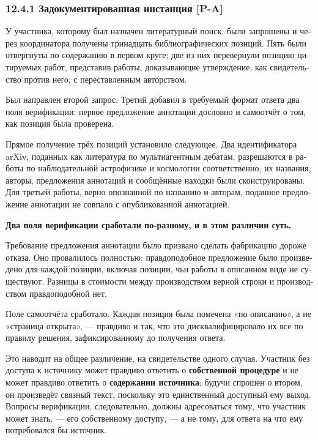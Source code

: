 \begin{russian}
\subsubsection*{12.4.1 Задокументированная инстанция \textbf{[P-A]}}
\label{sec:ru:12.4.1}

У участника, которому был назначен литературный поиск, были запрошены и через координатора получены тринадцать библиографических позиций. Пять были отвергнуты по содержанию в первом круге; две из них перевернули позицию цитируемых работ, представив работы, доказывающие утверждение, как свидетельство против него, с переставленным авторством.

Был направлен второй запрос. Третий добавил в требуемый формат ответа два поля верификации: первое предложение аннотации дословно и самоотчёт о том, как позиция была проверена.

Прямое получение трёх позиций установило следующее. Два идентификатора arXiv, поданных как литература по мультиагентным дебатам, разрешаются в работы по наблюдательной астрофизике и космологии соответственно; их названия, авторы, предложения аннотаций и сообщённые находки были сконструированы. Для третьей работы, верно опознанной по названию и авторам, поданное предложение аннотации не совпало с опубликованной аннотацией.

\textbf{Два поля верификации сработали по-разному, и в этом различии суть.}

Требование предложения аннотации было призвано сделать фабрикацию дороже отказа. Оно провалилось полностью: правдоподобное предложение было произведено для каждой позиции, включая позиции, чьи работы в описанном виде не существуют. Разницы в стоимости между производством верной строки и производством правдоподобной нет.

Поле самоотчёта сработало. Каждая позиция была помечена «по описанию», а не «страница открыта», — правдиво и так, что это дисквалифицировало их все по правилу решения, зафиксированному до получения ответа.

Это наводит на общее различение, на свидетельстве одного случая. Участник без доступа к источнику может правдиво ответить о \textbf{собственной процедуре} и не может правдиво ответить о \textbf{содержании источника}; будучи спрошен о втором, он произведёт связный текст, поскольку это единственный доступный ему выход. Вопросы верификации, следовательно, должны адресоваться тому, что участник может знать, — его собственному доступу, — а не тому, для ответа на что ему потребовался бы источник.


\end{russian}
